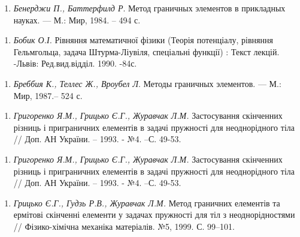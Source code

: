 \begin{enumerate}
\def\labelenumi{\arabic{enumi}.}
\tightlist
\item
  \protect\hypertarget{anchor-2}{}{}\emph{Бенерджи П., Баттерфилд Р}.
  Метод граничных элементов в прикладных науках. --- М.: Мир, 1984. --
  494 с.
\end{enumerate}

\begin{enumerate}
\def\labelenumi{\arabic{enumi}.}
\tightlist
\item
  \emph{Бобик О.І.} Рівняння математичної фізики (Теорія потенціалу,
  рівняння Гельмгольца, задача Штурма-Ліувіля, спеціальні функції) :
  Текст лекцій. -Львів: Ред.вид.відділ. 1990. -84с.
\end{enumerate}

\begin{enumerate}
\def\labelenumi{\arabic{enumi}.}
\tightlist
\item
  \protect\hypertarget{anchor-3}{}{}\emph{Бреббия К., Теллес Ж., Вроубел
  Л}. Методы граничных элементов. --- М.: Мир, 1987.-- 524 с.
\end{enumerate}

\begin{enumerate}
\def\labelenumi{\arabic{enumi}.}
\tightlist
\item
  \emph{Григоренко Я.М., Грицько Є.Г., Журавчак Л.М. }Застосування
  скінченних різниць і приграничних елементів в задачі пружності для
  неоднорідного тіла // Доп. АН України. -- 1993. - №4. --С. 49-53.
\end{enumerate}

\begin{enumerate}
\def\labelenumi{\arabic{enumi}.}
\tightlist
\item
  \protect\hypertarget{anchor-4}{}{}\emph{Григоренко Я.М., Грицько Є.Г.,
  Журавчак Л.М. }Застосування скінченних різниць і приграничних
  елементів в задачі пружності для неоднорідного тіла // Доп. АН
  України. -- 1993. - №4. --С. 49-53.
\end{enumerate}

\begin{enumerate}
\def\labelenumi{\arabic{enumi}.}
\tightlist
\item
  \protect\hypertarget{anchor-5}{}{}\emph{Грицько Є.Г., Гудзь Р.В.,
  Журавчак Л.М.} Метод граничних елементів та ермітові скінченні
  елементи у задачах пружності для тіл з неоднорідностями //
  Фізико-хімічна механіка матеріалів. №5, 1999. С. 99--101.
\end{enumerate}

